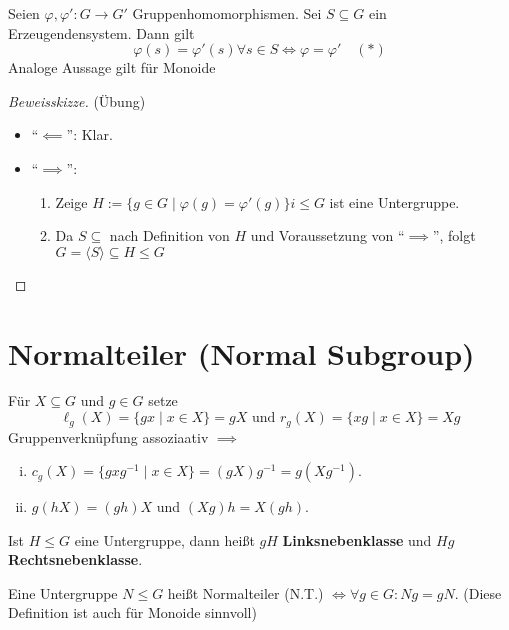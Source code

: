 \documentclass[a4paper]{report}
\begin{document}
\begin{lemm}
  Seien $\varphi, \varphi' : G \to G'$ Gruppenhomomorphismen. Sei $S \subseteq G$ ein Erzeugendensystem. Dann gilt
  $$\varphi(s) = \varphi'(s) \forall s \in S \iff \varphi = \varphi'\quad (*)$$
  Analoge Aussage gilt für Monoide
\end{lemm}
\begin{proof}[Beweisskizze](Übung)
  \begin{itemize}
          \item ``$\impliedby$'': Klar.
    \item ``$\implies$'':
          \begin{enumerate}[1)]
            \item Zeige $H := \{g \in G \mid \varphi(g) = \varphi'(g)\}i \le G$ ist eine Untergruppe.
            \item Da $S \subseteq$ nach Definition von $H$ und Voraussetzung von ``$\implies$'', folgt $G = \langle S \rangle \subseteq H \le G$
          \end{enumerate}
  \end{itemize}
\end{proof}
\section*{Normalteiler (Normal Subgroup)}
\begin{nota*}
  Für $X \subseteq G$ und $g \in G$ setze $$\ell_{g}(X) = \{gx \mid x \in X\} = gX \text{ und } r_{g}(X) = \{xg \mid x \in X\} = Xg$$
  Gruppenverknüpfung assoziaativ $\implies$
  \begin{enumerate}[(i)]
    \item $c_{g}(X) = \{gxg^{-1} \mid x \in X\} = (gX)g^{-1} = g(Xg^{-1})$.
    \item $g(hX) = (gh)X$ und $(Xg)h = X(gh)$.
  \end{enumerate}
\end{nota*}

\begin{bem*} Ist $H \le G$ eine Untergruppe, dann heißt $gH$ \textbf{Linksnebenklasse} und $Hg$ \textbf{Rechtsnebenklasse}.
\end{bem*}

\begin{defi}
  Eine Untergruppe $N \le G$ heißt Normalteiler (N.T.) $\iff \forall g \in G : Ng = gN$. (Diese Definition ist auch für Monoide sinnvoll)
\end{defi}
\end{document}
